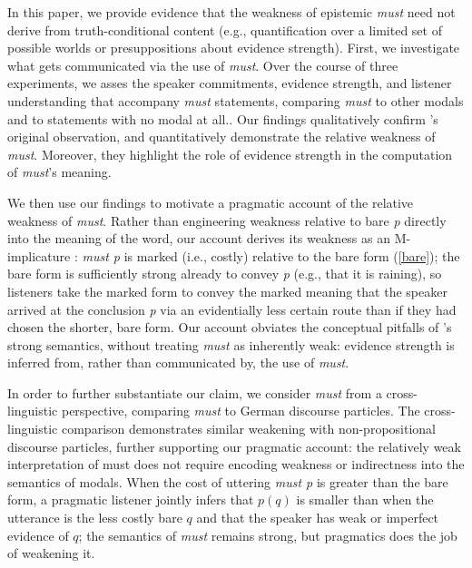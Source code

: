 \documentclass[11pt]{article}
\begin{document}
In this paper, we provide evidence that the weakness of epistemic \emph{must} need not derive from truth-conditional content (e.g., quantification over a limited set of possible worlds or presuppositions about evidence strength). First, we investigate what gets communicated via the use of \emph{must}. Over the course of three experiments, we asses the speaker commitments, evidence strength, and listener understanding that accompany \emph{must} statements, comparing \emph{must} to other modals and to statements with no modal at all.. Our findings qualitatively confirm \citeauthor{karttunen1972}'s original observation, and quantitatively demonstrate the relative weakness of \emph{must}. Moreover, they highlight the role of evidence strength in the computation of \emph{must}'s meaning.

We then use our findings to motivate a pragmatic account of the relative weakness of \emph{must}. Rather than engineering weakness relative to bare \emph{p} directly into the meaning of the word, our account derives its weakness as an M-implicature \cite{grice1989,levinson2000}: \emph{must p} is marked (i.e., costly) relative to the bare form (\ref{bare}); the bare form is sufficiently strong already to convey \emph{p} (e.g., that it is raining), so listeners take the marked form to convey the marked meaning that the speaker arrived at the conclusion \emph{p} via an evidentially less certain route than if they had chosen the shorter, bare form. Our account obviates the conceptual pitfalls of \citeauthor{vonfintelgillies2010}'s strong semantics, without treating \emph{must} as inherently weak: evidence strength is inferred from, rather than communicated by, the use of \emph{must}. 

In order to further substantiate our claim, we consider \emph{must} from a cross-linguistic perspective, comparing \emph{must} to German discourse particles. 
The cross-linguistic comparison demonstrates similar weakening with non-propositional discourse particles, further supporting our pragmatic account: the relatively weak interpretation of must does not require encoding weakness or indirectness into the semantics of modals. When the cost of uttering \emph{must p} is greater than the bare form, a pragmatic listener jointly infers that $p(q)$ is smaller than when the utterance is the less costly bare $q$ and that the speaker has weak or imperfect evidence of $q$; the semantics of \emph{must} remains strong, but pragmatics does the job of weakening it.

\end{document}
